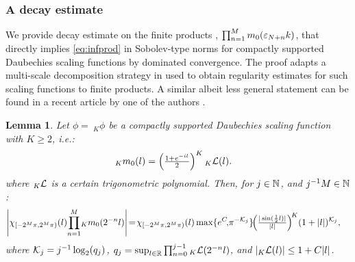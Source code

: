 \documentclass[a4paper, 11pt]{article}
\DeclareMathOperator{\1}{\mathds{1}}
\newtheorem{lemma}[thm]{Lemma}
\begin{document}
\subsubsection{A decay estimate}
\label{sec:convergence}
We provide decay estimate on the finite products , $\prod_{n=1}^{M}m_{0}(\varepsilon_{N+n}k)$, that directly implies \eqref{eq:infprod} in Sobolev-type norms for compactly supported Daubechies scaling functions by dominated convergence. The proof adapts a multi-scale decomposition strategy in \cite{DaubechiesTenLecturesOn} used to obtain regularity estimates for such scaling functions to finite products. A similar albeit less general statement can be found in a recent article by one of the authors \cite{MorinelliScalingLimitsOf}.

\begin{lemma}
\label{lem:convergence}
Let $\phi =\!\ _{K}\phi$ be a compactly supported Daubechies scaling function with $K\geq2$, i.e.:
\begin{align}
\label{eq:m0factor}
_{K}m_{0}(l) & = \left(\tfrac{1+e^{-il}}{2}\right)^{K} {}_{K}\mathcal{L}(l).
\end{align}
where ${}_{K}\mathcal{L}$ is a certain trigonometric polynomial. Then, for $j\in\mathbb{N}$, and $j^{-1}M\in\mathbb{N}$:
\begin{align}
\label{eq:convergence}
\left|\chi_{[-2^{M}\pi,2^{M}\pi)}(l)\!\prod_{n=1}^{M}\!{}_{K}m_{0}(2^{-n}l)\right| & \!=\!\chi_{[-2^{M}\pi,2^{M}\pi)}(l)\max\{e^{C}\!,\!\pi^{-\cK_{j}}\}\!\!\left(\tfrac{|\sin(\frac{1}{2}l)|}{|l|}\right)^{\!K}\!(1+|l|)^{\cK_{j}},
\end{align}
where $\mathcal{K}_{j} = j^{-1}\log_{2}(q_{j})$, $q_{j}=\sup_{l\in\mathbb{R}}\prod_{n=0}^{j-1}{}_{K}\mathcal{L}(2^{-n}l)$, and $|{}_{K}\mathcal{L}(l)|\leq 1+C|l|$.
\end{lemma}
\end{document}
